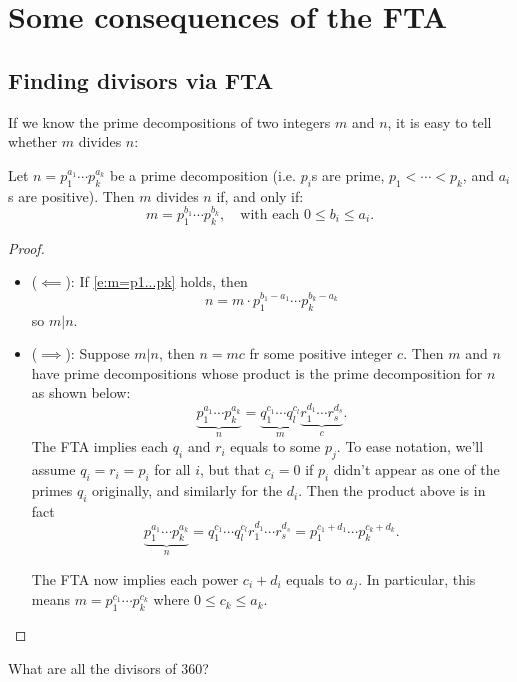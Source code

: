 \documentclass[11pt,dvipsnames]{book}
\numberwithin{equation}{section} %
\numberwithin{figure}{section} %
\numberwithin{table}{section} %
\begin{document}
\section{Some consequences of the FTA}
\subsection{Finding divisors via FTA}
If we know the prime decompositions of two integers $m$ and $n$, it is easy to tell whether $m$ divides $n$:

\begin{theorem}
Let $n=p_1^{a_1}\cdots p_k^{a_k}$ be a prime decomposition (i.e. $p_i$s are prime, $p_1<\cdots <p_k$, and $a_i$s are positive). Then $m$ divides $n$ if, and only if:
\begin{equation}
\label{e:m=p1...pk}
m = p_1^{b_1}\cdots p_k^{b_k}, \quad \textrm{with each $0\leq b_i\leq a_i$}.
\end{equation}
\end{theorem}

\begin{proof}
\begin{itemize}
\item  ($\impliedby$): If \eqref{e:m=p1...pk} holds, then
\[
n=m \cdot  p_1^{b_1-a_{1}}\cdots p_k^{b_k-a_{k}}
\]
so $m|n$.
 \item ($\implies$): Suppose $m|n$, then $n=mc$ fr some positive integer $c$.  Then $m$ and $n$ have prime decompositions whose product is the prime decomposition for $n$ as shown below:
$$\underbrace{p_1^{a_1}\cdots p_k^{a_k}}_n = \underbrace{q_1^{c_1}\cdots q_l^{c_l}}_m\underbrace{r_1^{d_1}\cdots r_s^{d_s}}_c.$$
The FTA implies each $q_i$ and $r_i$ equals to some $p_j$. To ease notation, we'll assume $q_{i}=r_{i}=p_{i}$ for all $i$, but that $c_{i}=0$ if $p_{i}$ didn't appear as one of the primes $q_{i}$ originally, and similarly for the $d_{i}$. Then the product above is in fact 
$$\underbrace{p_1^{a_1}\cdots p_k^{a_k}}_n = {q_1^{c_1}\cdots q_l^{c_l}}{r_1^{d_1}\cdots r_s^{d_s}} 
=p_{1}^{c_{1}+d_{1}}\cdots p_{k}^{c_{k}+d_{k}}.
$$

The FTA now implies each power $c_i+d_i$ equals to $a_j$. In particular, this means $m=p_{1}^{c_{1}}\cdots p_{k}^{c_{k}}$ where $0\leq c_{k}\leq a_{k}$. 
  \end{itemize}
\end{proof}


\begin{example}
What are all the divisors of $360$?
\end{example}
\end{document}
